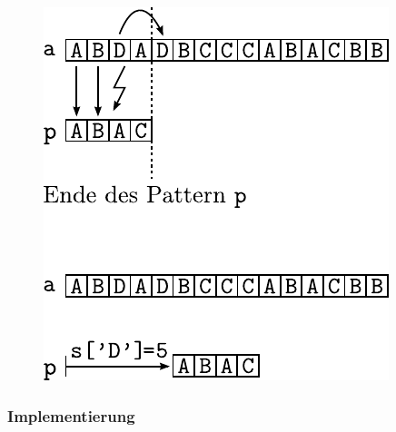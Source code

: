 \begin{figure}[h!]
	\centering
	\includegraphics[scale=0.9]{quicksearch-7.pdf}
\end{figure}

\subsubsection{Implementierung}




